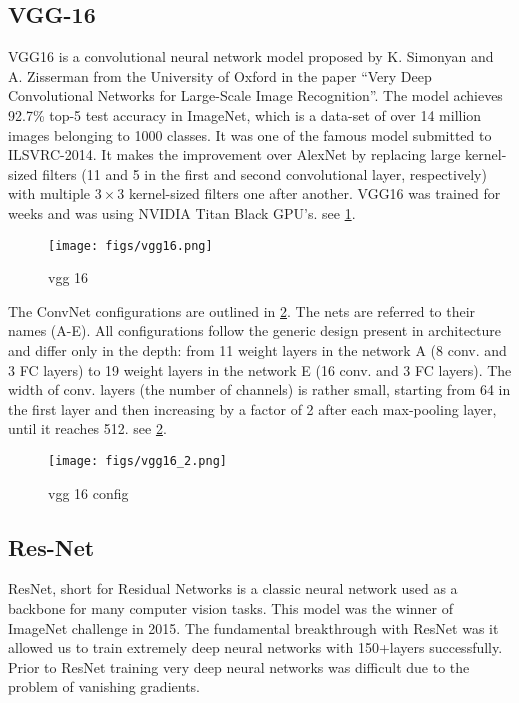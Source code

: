 \subsection{VGG-16}

VGG16 is a convolutional neural network model proposed by K. Simonyan and A. Zisserman from the University of Oxford in the paper “Very Deep Convolutional Networks for Large-Scale Image Recognition”. The model achieves 92.7\% top-5 test accuracy in ImageNet, which is a data-set of over 14 million images belonging to 1000 classes. It was one of the famous model submitted to ILSVRC-2014. It makes the improvement over AlexNet by replacing large kernel-sized filters (11 and 5 in the first and second convolutional layer, respectively) with multiple $3 \times 3$ kernel-sized filters one after another. VGG16 was trained for weeks and was using NVIDIA Titan Black GPU’s. see \cref{fig:vgg16}.

\begin{figure}[!htpb]
	\centering
	\texttt{[image: figs/vgg16.png]}
	\caption{vgg 16}\label{fig:vgg16}
\end{figure}

The ConvNet configurations are outlined in \cref{fig:vgg16_2}. The nets are referred to their names (A-E). All configurations follow the generic design present in architecture and differ only in the depth: from 11 weight layers in the network A (8 conv. and 3 FC layers) to 19 weight layers in the network E (16 conv. and 3 FC layers). The width of conv. layers (the number of channels) is rather small, starting from 64 in the first layer and then increasing by a factor of 2 after each max-pooling layer, until it reaches 512. see \cref{fig:vgg16_2}.

\begin{figure}[!htpb]
	\centering
	\texttt{[image: figs/vgg16\_2.png]}
	\caption{vgg 16 config}\label{fig:vgg16_2}
\end{figure}

\subsection{Res-Net}

ResNet, short for Residual Networks is a classic neural network used as a backbone for many computer vision tasks. This model was the winner of ImageNet challenge in 2015. The fundamental breakthrough with ResNet was it allowed us to train extremely deep neural networks with 150+layers successfully. Prior to ResNet training very deep neural networks was difficult due to the problem of vanishing gradients.


